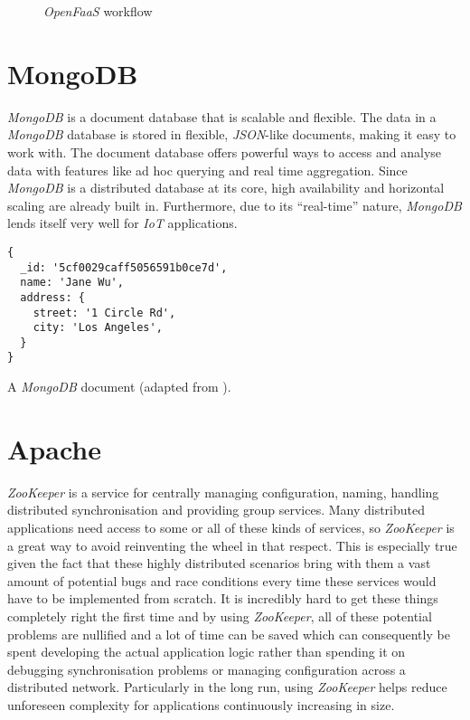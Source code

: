 \begin{figure}[H]
  \centering
  \caption{\textit{OpenFaaS} workflow \cite{openfaas-docs}}
\end{figure}

\section{MongoDB}

\textit{MongoDB} is a document database that is scalable and flexible. The data in a
\textit{MongoDB} database is stored in flexible, \textit{JSON}-like documents, making it easy to
work with. The document database offers powerful ways to access and analyse data with features like
ad hoc querying and real time aggregation. Since \textit{MongoDB} is a distributed database at its
core, high availability and horizontal scaling are already built in. Furthermore, due to its
“real-time” nature, \textit{MongoDB} lends itself very well for \textit{IoT} applications.
\cite{mongodb-description}

\begin{code}[H]
  \centering
  \begin{lstlisting}[language=mongo]
{
  _id: '5cf0029caff5056591b0ce7d',
  name: 'Jane Wu',
  address: {
    street: '1 Circle Rd',
    city: 'Los Angeles',
  }
}
  \end{lstlisting}
  \caption{A \textit{MongoDB} document (adapted from \cite{mongodb-description}).}
\end{code}

\section{Apache }
\label{sec:background-zookeeper}

\textit{ZooKeeper} is a service for centrally managing configuration, naming, handling distributed
synchronisation and providing group services. Many distributed applications need access to some or
all of these kinds of services, so \textit{ZooKeeper} is a great way to avoid reinventing the wheel
in that respect. This is especially true given the fact that these highly distributed scenarios
bring with them a vast amount of potential bugs and race conditions every time these services would
have to be implemented from scratch. It is incredibly hard to get these things completely right the
first time and by using \textit{ZooKeeper}, all of these potential problems are nullified and a lot
of time can be saved which can consequently be spent developing the actual application logic rather
than spending it on debugging synchronisation problems or managing configuration across a
distributed network. Particularly in the long run, using \textit{ZooKeeper} helps reduce unforeseen
complexity for applications continuously increasing in size.
\cite{zookeeper-homepage}

